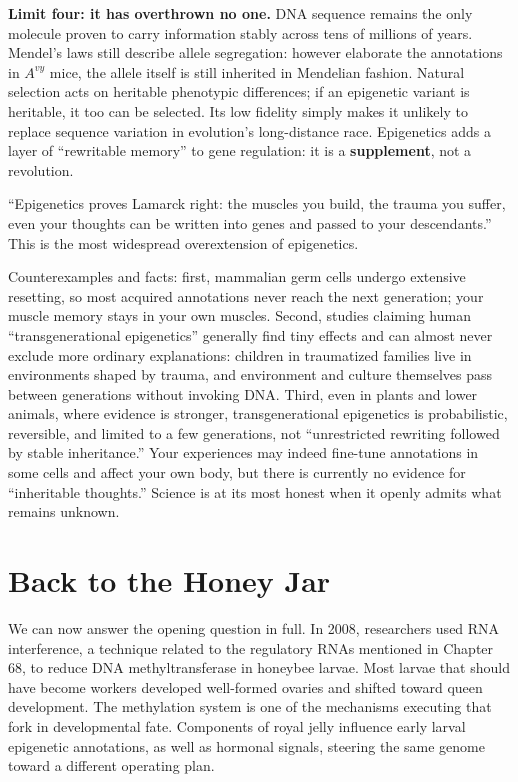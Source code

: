 \textbf{Limit four: it has overthrown no one.} DNA sequence remains the only molecule proven to carry information stably across tens of millions of years. Mendel's laws still describe allele segregation: however elaborate the annotations in $A^{vy}$ mice, the allele itself is still inherited in Mendelian fashion. Natural selection acts on heritable phenotypic differences; if an epigenetic variant is heritable, it too can be selected. Its low fidelity simply makes it unlikely to replace sequence variation in evolution's long-distance race. Epigenetics adds a layer of ``rewritable memory'' to gene regulation: it is a \textbf{supplement}, not a revolution.

\begin{wuqu}
``Epigenetics proves Lamarck right: the muscles you build, the trauma you suffer, even your thoughts can be written into genes and passed to your descendants.'' This is the most widespread overextension of epigenetics.

Counterexamples and facts: first, mammalian germ cells undergo extensive resetting, so most acquired annotations never reach the next generation; your muscle memory stays in your own muscles. Second, studies claiming human ``transgenerational epigenetics'' generally find tiny effects and can almost never exclude more ordinary explanations: children in traumatized families live in environments shaped by trauma, and environment and culture themselves pass between generations without invoking DNA. Third, even in plants and lower animals, where evidence is stronger, transgenerational epigenetics is probabilistic, reversible, and limited to a few generations, not ``unrestricted rewriting followed by stable inheritance.'' Your experiences may indeed fine-tune annotations in some cells and affect your own body, but there is currently no evidence for ``inheritable thoughts.'' Science is at its most honest when it openly admits what remains unknown.
\end{wuqu}

\section{Back to the Honey Jar}

We can now answer the opening question in full. In 2008, researchers used RNA interference, a technique related to the regulatory RNAs mentioned in Chapter 68, to reduce DNA methyltransferase in honeybee larvae. Most larvae that should have become workers developed well-formed ovaries and shifted toward queen development. The methylation system is one of the mechanisms executing that fork in developmental fate. Components of royal jelly influence early larval epigenetic annotations, as well as hormonal signals, steering the same genome toward a different operating plan.

